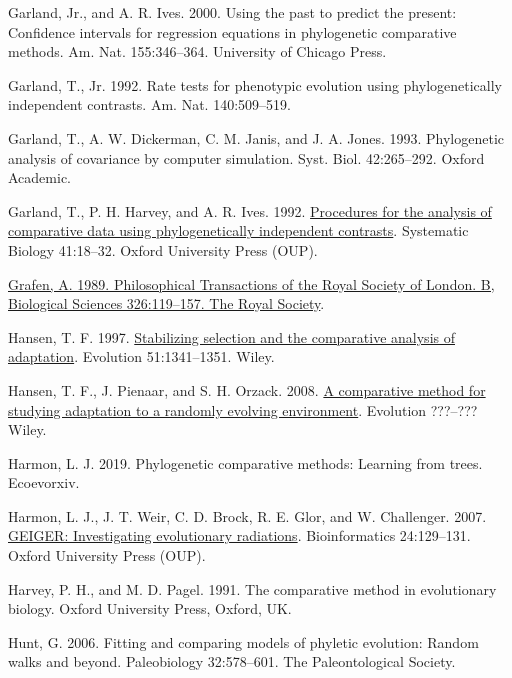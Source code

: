 \documentclass[fleqn,10pt,lineno]{wlpeerj} %
\newlength{\cslhangindent}
\newenvironment{CSLReferences}[2] %
 {\begin{list}{}{%
  \setlength{\itemindent}{0pt}
  \setlength{\leftmargin}{0pt}
  \setlength{\parsep}{0pt}
  \ifodd #1
   \setlength{\leftmargin}{\cslhangindent}
   \setlength{\itemindent}{-1\cslhangindent}
  \fi
  \setlength{\itemsep}{#2\baselineskip}}}
 {\end{list}}
\begin{document}
\begin{CSLReferences}{1}{0}
Garland, Jr., and A. R. Ives. 2000. Using the past to predict the present: Confidence intervals for regression equations in phylogenetic comparative methods. Am. Nat. 155:346--364. University of Chicago Press.

Garland, T., Jr. 1992. Rate tests for phenotypic evolution using phylogenetically independent contrasts. Am. Nat. 140:509--519.

Garland, T., A. W. Dickerman, C. M. Janis, and J. A. Jones. 1993. Phylogenetic analysis of covariance by computer simulation. Syst. Biol. 42:265--292. Oxford Academic.

Garland, T., P. H. Harvey, and A. R. Ives. 1992. \href{https://doi.org/10.1093/sysbio/41.1.18}{Procedures for the analysis of comparative data using phylogenetically independent contrasts}. Systematic Biology 41:18--32. Oxford University Press (OUP).

\href{https://doi.org/10.1098/rstb.1989.0106}{Grafen, A. 1989. Philosophical Transactions of the Royal Society of London. B, Biological Sciences 326:119--157. The Royal Society}.

Hansen, T. F. 1997. \href{https://doi.org/10.1111/j.1558-5646.1997.tb01457.x}{Stabilizing selection and the comparative analysis of adaptation}. Evolution 51:1341--1351. Wiley.

Hansen, T. F., J. Pienaar, and S. H. Orzack. 2008. \href{https://doi.org/10.1111/j.1558-5646.2008.00412.x}{A comparative method for studying adaptation to a randomly evolving environment}. Evolution ???--??? Wiley.

Harmon, L. J. 2019. Phylogenetic comparative methods: Learning from trees. Ecoevorxiv.

Harmon, L. J., J. T. Weir, C. D. Brock, R. E. Glor, and W. Challenger. 2007. \href{https://doi.org/10.1093/bioinformatics/btm538}{GEIGER: Investigating evolutionary radiations}. Bioinformatics 24:129--131. Oxford University Press (OUP).

Harvey, P. H., and M. D. Pagel. 1991. The comparative method in evolutionary biology. Oxford University Press, Oxford, UK.

Hunt, G. 2006. Fitting and comparing models of phyletic evolution: Random walks and beyond. Paleobiology 32:578--601. The Paleontological Society.


\end{CSLReferences}
\end{document}
